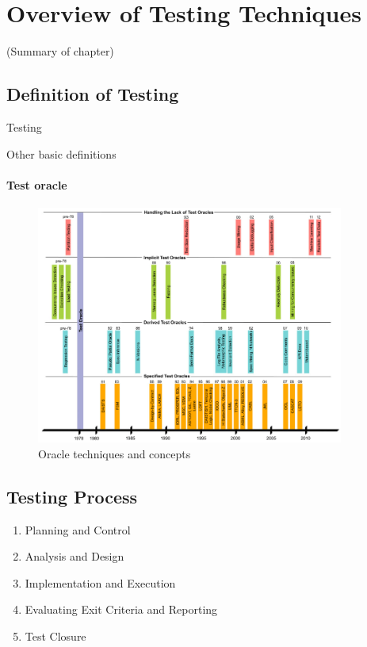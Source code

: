 \chapter{Overview of Testing Techniques}
\label{cha:overview-of-testing}

(Summary of chapter)

\section{Definition of Testing}
\label{sec:definition-of-testing}

Testing \cite{myers-1979}

Other basic definitions

\subsubsection{Test oracle}

\begin{figure}[ht]
    \centering
    \includegraphics[width=0.9\textwidth]{figures/oracle-survey-techniques}
    \caption{Oracle techniques and concepts \cite{oracle-survey}}
    \label{fig:overview-of-testing:oracle-survey-techniques}
    \end{figure}

\section{Testing Process}
\label{sec:testing-process}

\begin{enumerate}
    \item Planning and Control
    \item Analysis and Design
    \item Implementation and Execution
    \item Evaluating Exit Criteria and Reporting    
    \item Test Closure
\end{enumerate}

